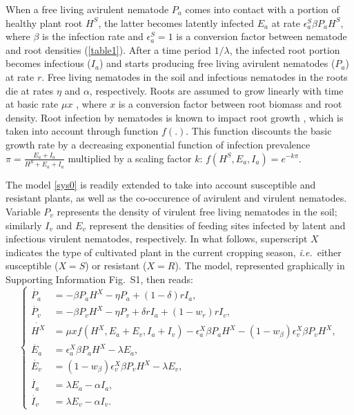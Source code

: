 {{{{When a free living avirulent nematode $P_{a}$ comes into contact with
a portion of healthy plant root $H^{S}$, the latter becomes latently
infected $E_{a}$ at rate $\epsilon_{a}^{S}\beta P_{a}H^{S}$, where
$\beta$ is the infection rate and $\epsilon_{a}^{S}=1$ is a conversion
factor between nematode and root densities (\autoref{table1}).
After a time period $1/\lambda$, the infected root portion becomes
infectious ($I_{a}$) and starts producing free living avirulent
nematodes ($P_{a}$) at rate $r$. Free living nematodes in the soil
and infectious nematodes in the roots die at rates $\eta$ and $\alpha$,
respectively. Roots are assumed to grow linearly with time at basic
rate $\mu x$ \citep{Leskovar1990}, where $x$ is a conversion factor
between root biomass and root density. Root infection by nematodes
is known to impact root growth \citep{Zeck1971}, which is taken into
account through function $f(.)$. This function discounts the basic
growth rate by a decreasing exponential function of infection prevalence
$\pi=\frac{E_{a}+I_{a}}{H^{S}+E_{a}+I_{a}}$ multiplied by a scaling
factor $k$: $f(H^{S},E_{a},I_{a})=e^{-k\pi}$.

The model \eqref{sys0} is readily extended to take into account
susceptible and resistant plants, as well as the co-occurence of
avirulent and virulent nematodes. Variable $P_{v}$ represents the
density of virulent free living nematodes in the soil; similarly
$I_{v}$ and $E_{v}$ represent the densities of feeding sites infected
by latent and infectious virulent nematodes, respectively. In what
follows, superscript $X$ indicates the type of cultivated plant in the
current cropping season, \textit{i.e.}\ either susceptible ($X=S$) or
resistant ($X=R$). The model, represented graphically in Supporting
Information Fig.~S1, then reads:
\begin{equation}
  \left\{
    \begin{aligned}
      \dot{P_{a}} & =-\beta P_{a}H^{X}-\eta P_{a}+(1-\delta)rI_{a},\\
      \dot{P_{v}} & =-\beta P_{v}H^{X}-\eta P_{v}+\delta rI_{a}+(1-w_{r})rI_{v},\\
      \dot{H^{X}} & =\mu xf(H^{X},E_{a}+E_{v},I_{a}+I_{v})-\epsilon_{a}^{X}\beta P_{a}H^{X}-(1-w_{\beta})\epsilon_{v}^{X}\beta P_{v}H^{X},\\
      \dot{E_{a}} & =\epsilon_{a}^{X}\beta P_{a}H^{X}-\lambda E_{a},\\
      \dot{E_{v}} & =(1-w_{\beta})\epsilon_{v}^{X}\beta P_{v}H^{X}-\lambda E_{v},\\
      \dot{I_{a}} & =\lambda E_{a}-\alpha I_{a},\\
      \dot{I_{v}} & =\lambda E_{v}-\alpha I_{v}.
    \end{aligned}
  \right.
  \label{sys1}
\end{equation}

}}}}

